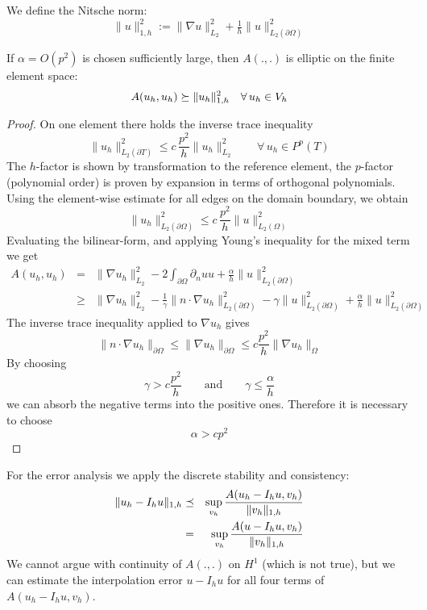 We define the Nitsche norm:
$$
\| u \|^2_{1,h} := \| \nabla u \|_{L_2}^2 + \tfrac{1}{h} \| u
\|_{L_2(\partial \Omega)}^2
$$
\begin{lemma} If $\alpha = O(p^2)$ is chosen sufficiently large, then
  $A(.,.)$ is elliptic on the finite element space:
$$
A(u_h, u_h) \succeq \| u_h \|^2_{1,h}  \quad \forall \, u_h \in V_h
$$
\end{lemma}
\begin{proof} On one element there holds the inverse trace inequality
$$
\| u_h \|_{L_2(\partial T)}^2 \leq  c \, \frac{p^2}{h} \| u_h \|_{L_2}^2
\qquad \forall \, u_h \in P^p(T)
$$
The $h$-factor is shown by transformation to the reference element,
the $p$-factor (polynomial order) is proven by expansion in terms of orthogonal
polynomials. Using the element-wise estimate for all edges on the
domain boundary, we obtain
\begin{equation}
\| u_h \|_{L_2(\partial \Omega)}^2 \leq c \, \frac{p^2}{h} \| u \|_{L_2(\Omega)}^2
\end{equation}
Evaluating the bilinear-form, and applying Young's inequality for the
mixed term we get
\begin{eqnarray*}
A(u_h, u_h) & = & \| \nabla u_h \|^2_{L_2} - 2 \int_{\partial
                  \Omega}  \partial_n u u + \frac{\alpha}{h}
                  \| u \|_{L_2(\partial \Omega)}^2 \\
& \geq & \| \nabla u_h \|^2_{L_2} 
         - \tfrac{1}{\gamma} \| n\cdot \nabla u_h \|_{L_2(\partial
         \Omega)} ^2 
      - \gamma \| u \|_{L_2(\partial \Omega)}^2 + \frac{\alpha}{h}
                  \| u \|_{L_2(\partial \Omega)}^2 
\end{eqnarray*}
The inverse trace inequality applied to $\nabla u_h$ gives
$$
\| n \cdot \nabla u_h \|_{\partial \Omega} \leq \| \nabla u_h
\|_{\partial \Omega}
 \leq c \frac{p^2}{h} \| \nabla u_h \|_\Omega
$$
By choosing 
$$
\gamma > c \frac{p^2}{h} \qquad \text{and} \qquad \gamma \leq
\frac{\alpha}{h}
$$
we can absorb the negative terms into the positive ones. Therefore it
is necessary to choose 
$$
\alpha > c p^2
$$
\end{proof}

For the error analysis we apply the discrete stability and
consistency:
\begin{eqnarray*}
\| u_h - I_h u\|_{1,h} & \preceq & \sup_{v_h}  \frac{ A(u_h - I_h u,
                                 v_h)  }{ \| v_h \|_{1,h}} \\
& = & \sup_{v_h}  \frac{ A(u - I_h u,
                                 v_h)  }{ \| v_h \|_{1,h}} 
\end{eqnarray*}
We cannot argue with continuity of $A(.,.)$ on $H^1$ (which is not
true), but we can estimate the interpolation error $u - I_hu$ for all four
terms of $A(u_h - I_h u, v_h)$.

